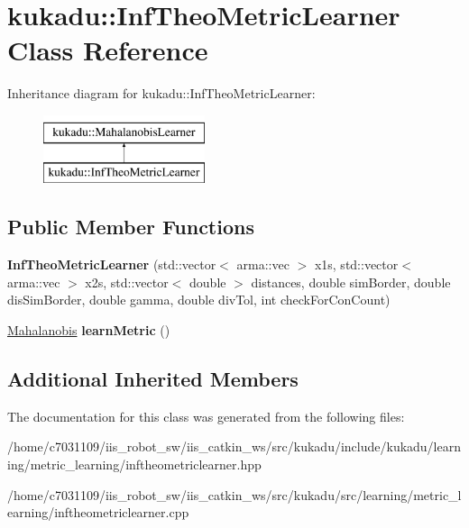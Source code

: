 \hypertarget{classkukadu_1_1InfTheoMetricLearner}{\section{kukadu\-:\-:Inf\-Theo\-Metric\-Learner Class Reference}
\label{classkukadu_1_1InfTheoMetricLearner}
}
Inheritance diagram for kukadu\-:\-:Inf\-Theo\-Metric\-Learner\-:\begin{figure}[H]
\begin{center}
\leavevmode
\includegraphics[height=2.000000cm]{classkukadu_1_1InfTheoMetricLearner}
\end{center}
\end{figure}
\subsection*{Public Member Functions}
\begin{DoxyCompactItemize}
\item 
\hypertarget{classkukadu_1_1InfTheoMetricLearner_a7d69af547c7d4337a7469662628a35b6}{{\bfseries Inf\-Theo\-Metric\-Learner} (std\-::vector$<$ arma\-::vec $>$ x1s, std\-::vector$<$ arma\-::vec $>$ x2s, std\-::vector$<$ double $>$ distances, double sim\-Border, double dis\-Sim\-Border, double gamma, double div\-Tol, int check\-For\-Con\-Count)}\label{classkukadu_1_1InfTheoMetricLearner_a7d69af547c7d4337a7469662628a35b6}

\item 
\hypertarget{classkukadu_1_1InfTheoMetricLearner_ada74ff5d257bf64a5c3e1a4ba910148d}{\hyperlink{classkukadu_1_1Mahalanobis}{Mahalanobis} {\bfseries learn\-Metric} ()}\label{classkukadu_1_1InfTheoMetricLearner_ada74ff5d257bf64a5c3e1a4ba910148d}

\end{DoxyCompactItemize}
\subsection*{Additional Inherited Members}


The documentation for this class was generated from the following files\-:\begin{DoxyCompactItemize}
\item 
/home/c7031109/iis\-\_\-robot\-\_\-sw/iis\-\_\-catkin\-\_\-ws/src/kukadu/include/kukadu/learning/metric\-\_\-learning/inftheometriclearner.\-hpp\item 
/home/c7031109/iis\-\_\-robot\-\_\-sw/iis\-\_\-catkin\-\_\-ws/src/kukadu/src/learning/metric\-\_\-learning/inftheometriclearner.\-cpp\end{DoxyCompactItemize}
